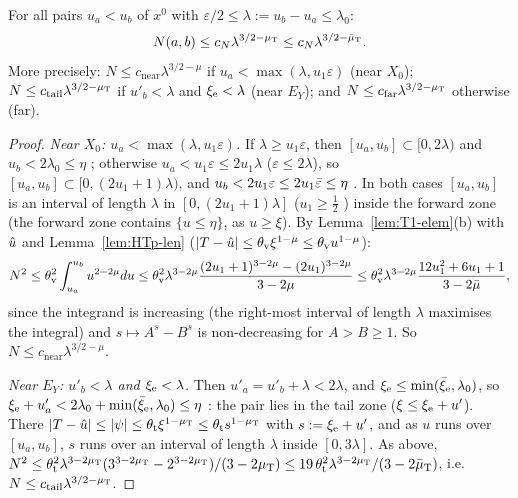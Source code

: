 \begin{lemma}\label{lem:HTp-T1}
For all pairs $u_a<u_b$ of $x^0$ with $\varepsilon/2\le\lambda:=u_b-u_a\le\lambda_0$:
\[
N(a,b)\le c_N\lambda^{3/2-\mu_{\mathrm T}}\le c_N\lambda^{3/2-\bar\mu_{\mathrm T}}.
\]
More precisely: $N\le c_{\mathrm{near}}\lambda^{3/2-\mu}$ if $u_a<\max(\lambda,u_1\varepsilon)$ (near $X_0$);
$N\le c_{\mathrm{tail}}\lambda^{3/2-\mu_{\mathrm T}}$ if $u'_b<\lambda$ and $\xi_{\mathrm e}<\lambda$ (near $E_Y$); and $N\le c_{\mathrm{far}}\lambda^{3/2-\mu_{\mathrm T}}$
otherwise (far).
\end{lemma}
\begin{proof}
\emph{Near $X_0$: $u_a<\max(\lambda,u_1\varepsilon)$.} If $\lambda\ge u_1\varepsilon$, then $[u_a,u_b]\subset[0,2\lambda)$ and
$u_b<2\lambda_0\le\eta$ ; otherwise $u_a<u_1\varepsilon\le2u_1\lambda$ ($\varepsilon\le2\lambda$), so $[u_a,u_b]\subset[0,(2u_1+1)\lambda)$,
and $u_b<2u_1\varepsilon\le2u_1\bar\varepsilon\le\eta$ . In both cases $[u_a,u_b]$ is an interval of length $\lambda$ in $[0,(2u_1+1)\lambda]$
($u_1\ge\frac12$ ) inside the forward zone (the forward zone contains $\{u\le\eta\}$, as $u\ge\xi$). By Lemma~\ref{lem:T1-elem}(b)
with $\hat u$ and Lemma~\ref{lem:HTp-len} ($|T-\hat u|\le\theta_{\mathrm v}\xi^{1-\mu}\le\theta_{\mathrm v}u^{1-\mu}$):
\[
N^2\le\theta_{\mathrm v}^2\int_{u_a}^{u_b}u^{2-2\mu}du\le\theta_{\mathrm v}^2\lambda^{3-2\mu}\frac{(2u_1+1)^{3-2\mu}-(2u_1)^{3-2\mu}}{3-2\mu}
\le\theta_{\mathrm v}^2\lambda^{3-2\mu}\frac{12u_1^2+6u_1+1}{3-2\bar\mu},
\]
since the integrand is increasing (the right-most interval of length $\lambda$ maximises the integral) and $s\mapsto A^s-B^s$ is
non-decreasing for $A>B\ge1$. So $N\le c_{\mathrm{near}}\lambda^{3/2-\mu}$.

\emph{Near $E_Y$: $u'_b<\lambda$ and $\xi_{\mathrm e}<\lambda$.} Then $u'_a=u'_b+\lambda<2\lambda$, and $\xi_{\mathrm e}\le\min(\bar\xi_{\mathrm e},\lambda_0)$, so
$\xi_{\mathrm e}+u'_a<2\lambda_0+\min(\bar\xi_{\mathrm e},\lambda_0)\le\eta$ : the pair lies in the tail zone ($\xi\le\xi_{\mathrm e}+u'$). There
$|T-\hat u|\le|\psi|\le\theta_{\mathrm t}\xi^{1-\mu_{\mathrm T}}\le\theta_{\mathrm t}s^{1-\mu_{\mathrm T}}$ with $s:=\xi_{\mathrm e}+u'$, and as $u$ runs over $[u_a,u_b]$,
$s$ runs over an interval of length $\lambda$ inside $[0,3\lambda]$. As above,
$N^2\le\theta_{\mathrm t}^2\lambda^{3-2\mu_{\mathrm T}}(3^{3-2\mu_{\mathrm T}}-2^{3-2\mu_{\mathrm T}})/(3-2\mu_{\mathrm T})\le19\,\theta_{\mathrm t}^2\lambda^{3-2\mu_{\mathrm T}}/(3-2\bar\mu_{\mathrm T})$, i.e.\
$N\le c_{\mathrm{tail}}\lambda^{3/2-\mu_{\mathrm T}}$.


\end{proof}
